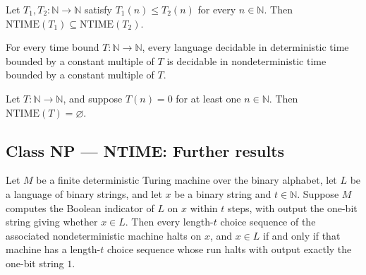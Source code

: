 \begin{theorem}
\label{Complexity.NTIME.mono}
\leanok
{}
Let $T_1,T_2:\mathbb{N}\to\mathbb{N}$ satisfy $T_1(n)\le T_2(n)$ for every
$n\in\mathbb{N}$. Then $\mathrm{NTIME}(T_1)\subseteq\mathrm{NTIME}(T_2)$.
\end{theorem}

\begin{theorem}
\label{Complexity.DTIME_subset_NTIME}
\leanok
{}
For every time bound $T : \mathbb{N} \to \mathbb{N}$, every language decidable in
deterministic time bounded by a constant multiple of $T$ is decidable in
nondeterministic time bounded by a constant multiple of $T$.
\end{theorem}

\begin{theorem}
\label{Complexity.NTIME_eq_empty_of_exists_zero}
\leanok
{}
Let $T:\mathbb{N}\to\mathbb{N}$, and suppose $T(n)=0$ for at least one $n\in\mathbb{N}$.
Then $\mathrm{NTIME}(T)=\varnothing$.
\end{theorem}

\subsection*{Class NP --- NTIME: Further results}

\begin{theorem}
\label{Turing.FinTM.toFinNDTM_haltsWithin_and_accepts_iff}
\leanok
{}
Let $M$ be a finite deterministic Turing machine over the binary alphabet, let $L$ be a
language of binary strings, and let $x$ be a binary string and $t\in\mathbb{N}$. Suppose
$M$ computes the Boolean indicator of $L$ on $x$ within $t$ steps, with output the
one-bit string giving whether $x\in L$. Then every length-$t$ choice sequence of the
associated nondeterministic machine halts on $x$, and $x\in L$ if and only if that
machine has a length-$t$ choice sequence whose run halts with output exactly the one-bit
string $1$.
\end{theorem}
